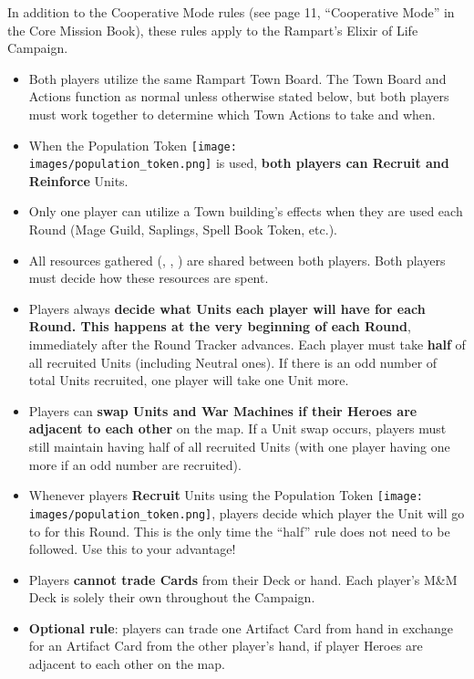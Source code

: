 
\begin{multicols*}{2}

In addition to the Cooperative Mode rules (see page 11, ``Cooperative Mode'' in the Core Mission Book), these rules apply to the Rampart's Elixir of Life Campaign.

\begin{itemize}
  \item Both players utilize the same Rampart Town Board.
    The Town Board and Actions function as normal unless otherwise stated below, but both players must work together to determine which Town Actions to take and when.
  \item When the Population Token {\texttt{[image: \\images/population\_token.png]}} is used, \textbf{both players can Recruit and Reinforce} Units.
  \item Only one player can utilize a Town building's effects when they are used each Round (Mage Guild, Saplings, Spell Book Token, etc.).
  \item All resources gathered (, , ) are shared between both players.
    Both players must decide how these resources are spent.
  \item Players always \textbf{decide what Units each player will have for each Round.
    This happens at the very beginning of each Round}, immediately after the Round Tracker advances.
    Each player must take \textbf{half} of all recruited Units (including Neutral ones).
    If there is an odd number of total Units recruited, one player will take one Unit more.
  \item Players can \textbf{swap Units and War Machines if their Heroes are adjacent to each other} on the map.
    If a Unit swap occurs, players must still maintain having half of all recruited Units (with one player having one more if an odd number are recruited).
  \columnbreak
  \item Whenever players \textbf{Recruit} Units using the Population Token {\texttt{[image: \\images/population\_token.png]}}, players decide which player the Unit will go to for this Round.
    This is the only time the ``half'' rule does not need to be followed.
    Use this to your advantage!
  \item Players \textbf{cannot trade Cards} from their Deck or hand.
    Each player's M\&M Deck is solely their own throughout the Campaign.
  \item \textbf{Optional rule}: players can trade one Artifact Card from hand in exchange for an Artifact Card from the other player's hand, if player Heroes are adjacent to each other on the map.
\end{itemize}

\vspace*{\fill}
\begin{center}
\end{center}

\end{multicols*}
